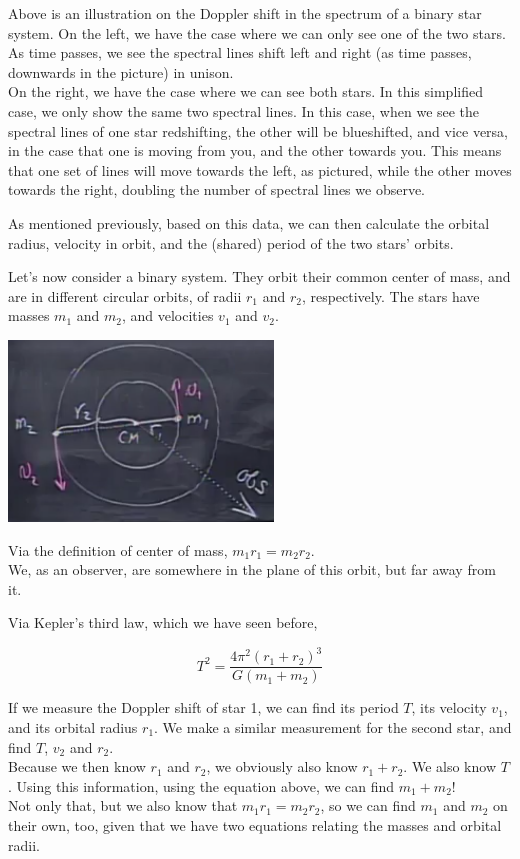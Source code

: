 \documentclass[8.01x]{subfiles}
\begin{document}
Above is an illustration on the Doppler shift in the spectrum of a binary star system. On the left, we have the case where we can only see one of the two stars. As time passes, we see the spectral lines shift left and right (as time passes, downwards in the picture) in unison.\\
On the right, we have the case where we can see both stars. In this simplified case, we only show the same two spectral lines. In this case, when we see the spectral lines of one star redshifting, the other will be blueshifted, and vice versa, in the case that one is moving from you, and the other towards you. This means that one set of lines will move towards the left, as pictured, while the other moves towards the right, doubling the number of spectral lines we observe.

As mentioned previously, based on this data, we can then calculate the orbital radius, velocity in orbit, and the (shared) period of the two stars' orbits.

Let's now consider a binary system. They orbit their common center of mass, and are in different circular orbits, of radii $r_1$ and $r_2$, respectively. The stars have masses $m_1$ and $m_2$, and velocities $v_1$ and $v_2$.

\begin{center}
\includegraphics[scale=0.75]{Graphics/lec23_binary_orbit}
\end{center}

Via the definition of center of mass, $m_1 r_1 = m_2 r_2$.\\
We, as an observer, are somewhere in the plane of this orbit, but far away from it.

Via Kepler's third law, which we have seen before,

\begin{equation}
T^2 = \frac{4 \pi^2 (r_1 + r_2)^3}{G (m_1 + m_2)}
\end{equation}

If we measure the Doppler shift of star 1, we can find its period $T$, its velocity $v_1$, and its orbital radius $r_1$. We make a similar measurement for the second star, and find $T$, $v_2$ and $r_2$.\\
Because we then know $r_1$ and $r_2$, we obviously also know $r_1 + r_2$. We also know $T$. Using this information, using the equation above, we can find $m_1 + m_2$!\\
Not only that, but we also know that $m_1 r_1 = m_2 r_2$, so we can find $m_1$ and $m_2$ on their own, too, given that we have two equations relating the masses and orbital radii.
\end{document}
